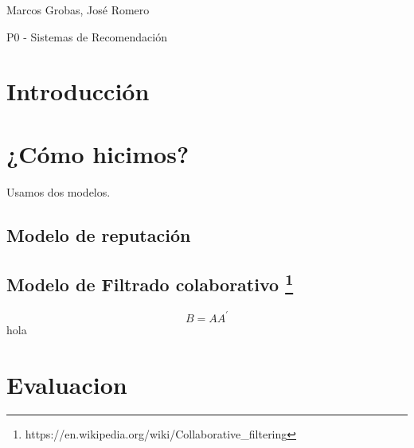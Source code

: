 \documentclass{article}
\begin{document}
{\centering \textsf{Marcos Grobas, José Romero}\par}

\vspace{0.5in}

{\huge P0 - Sistemas de Recomendación}

\vspace{0.5in}

\section{Introducción}

\section{¿Cómo hicimos?}
Usamos dos modelos.

\subsection{Modelo de reputación}
\subsection{Modelo de Filtrado colaborativo \footnote{https://en.wikipedia.org/wiki/Collaborative\_filtering}}
\[B = AA^{'}\] hola

\section{Evaluacion}
\end{document}
